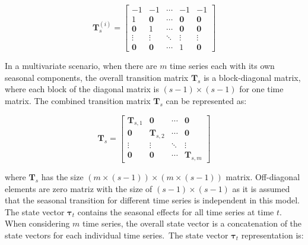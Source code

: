     \begin{equation}
        \mathbf{T}_s^{(i)}=
            \left[
                \begin{array}{ccccc}
                    -1             & -1         & \cdots &  -1        & -1 \\
                    1              & \mathbf{0} & \cdots & \mathbf{0} & \mathbf{0} \\
                    \mathbf{0}     & 1          & \cdots & \mathbf{0} & \mathbf{0} \\
                    \vdots         & \vdots     & \ddots & \vdots     & \vdots \\
                    \mathbf{0}     & \mathbf{0} & \cdots & 1          & \mathbf{0}
                \end{array}
            \right]
    \label{eq:seasonal_transition_uni}
    \end{equation}

    In a multivariate scenario, when there are $m$ time series each with its own seasonal components,
    the overall transition matrix $\mathbf{T}_s$ is a block-diagonal matrix, where each block of the diagonal matrix
    is $(s-1) \times (s-1)$ for one time matrix.
    The combined transition matrix $\mathbf{T}_{s}$ can be represented as:

    \begin{equation}
        \mathbf{T}_s=
            \left[
                \begin{array}{cccc}
                    \mathbf{T}_{s, 1} & \mathbf{0}        & \cdots & \mathbf{0} \\
                    \mathbf{0}        & \mathbf{T}_{s, 2} & \cdots & \mathbf{0} \\
                    \vdots            & \vdots            & \ddots & \vdots     \\
                    \mathbf{0}        & \mathbf{0}        & \cdots & \mathbf{T}_{s, m}
                \end{array}
            \right]
        \label{eq:seasonal_transition_mv}
    \end{equation}

    where $\mathbf{T}_{s}$ has the size $(m \times (s-1)) \times (m \times (s-1))$ matrix.
    Off-diagonal elements are zero matriz with the size of $(s-1) \times (s-1)$ as it is assumed that the seasonal transition
    for different time series is independent in this model.
    The state vector $\bm{\tau}_t$ contains the seasonal effects for all time series at time $t$.
    When considering $m$ time series, the overall state vector is a concatenation of the state vectors for each
    individual time series.\ The state vector $\bm{\tau}_t$ representation is:

